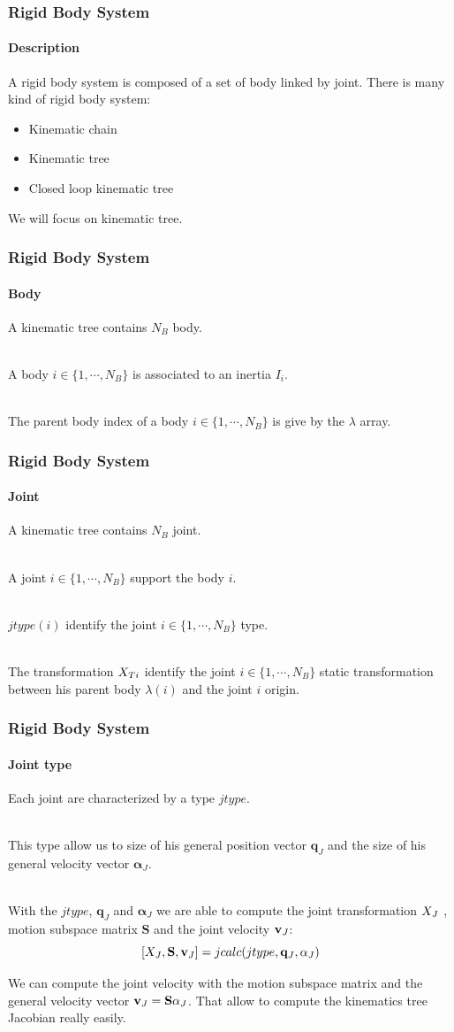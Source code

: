 \documentclass{beamer}
\begin{document}
\begin{frame}
\frametitle{Rigid Body System}
\framesubtitle{Description}
A rigid body system is composed of a set of body linked by joint.
There is many kind of rigid body system:
\begin{itemize}
	\item Kinematic chain
	\item Kinematic tree
	\item Closed loop kinematic tree
\end{itemize}
We will focus on kinematic tree.
\end{frame}
\begin{frame}
\frametitle{Rigid Body System}
\framesubtitle{Body}
A kinematic tree contains $ N_B $ body.

\hfill \\
A body $ i \in \{1, \cdots, N_B\} $ is associated to an inertia $ I_i $.

\hfill \\
The parent body index of a body $ i \in \{1, \cdots, N_B\} $ is give by the $ \lambda $ array.
\end{frame}
\begin{frame}
\frametitle{Rigid Body System}
\framesubtitle{Joint}
A kinematic tree contains $ N_B $ joint.

\hfill \\
A joint $ i \in \{1, \cdots, N_B\} $ support the body $ i $.

\hfill \\
$ jtype(i) $ identify the joint $ i \in \{1, \cdots, N_B\} $ type.

\hfill \\
			The transformation $ X_{Ti} $ identify the joint $ i \in \{1, \cdots, N_B\} $
static transformation between his parent body $ \lambda(i) $ and the joint $ i $ origin.
\end{frame}
\begin{frame}
\frametitle{Rigid Body System}
\framesubtitle{Joint type}
Each joint are characterized by a type $ jtype $.

\hfill \\
This type allow us to size of his general position vector $ \mathbf{q}_J $ and the size
of his general velocity vector $ \mathbf{\alpha}_J $.

\hfill \\
With the $ jtype $, $ \mathbf{q}_J $ and $ \mathbf{\alpha}_J $ we are able to compute the joint
transformation $ X_J $ , motion subspace matrix $ \mathbf{S} $ and
the joint velocity $ \mathbf{v}_J $:
$$
[X_J, \mathbf{S}, \mathbf{v}_J] = jcalc(jtype, \mathbf{q}_J, \mathbf{\alpha}_J)
$$

We can compute the joint velocity with the motion subspace matrix and
the general velocity vector $ \mathbf{v}_J = \mathbf{S}\mathbf{\alpha}_J $.
That allow to compute the kinematics tree Jacobian really easily.
\end{frame}
\end{document}
